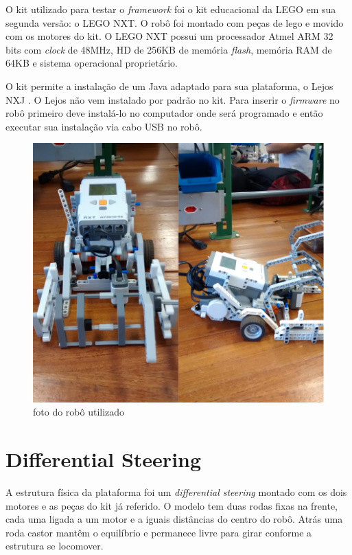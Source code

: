 O kit utilizado para testar o \textit{framework} foi o kit educacional da LEGO em sua segunda versão: o LEGO NXT. O robô foi montado com peças de lego e movido com os motores do kit. O LEGO NXT possui um processador Atmel ARM 32 bits com \textit{clock} de 48MHz, HD de 256KB de memória \textit{flash}, memória RAM de 64KB e sistema operacional proprietário.

O kit permite a instalação de um Java adaptado para sua plataforma, o Lejos NXJ \cite{LEJOS_SITE}. O Lejos não vem instalado por padrão no kit. Para inserir o \textit{firmware} no robô primeiro deve instalá-lo no computador onde será programado e então executar sua instalação via cabo USB no robô.

\begin{figure}[h]
	\centering
	\label{fig17}
		\includegraphics[keepaspectratio=true,scale=0.2]{figuras/5nxtBrick.png}
	\caption{foto do robô utilizado}
\end{figure}

\section{Differential Steering}

A estrutura física da plataforma foi um \textit{differential steering} montado com os dois motores e as peças do kit já referido. O modelo tem duas rodas fixas na frente, cada uma ligada a um motor e a iguais distâncias do centro do robô. Atrás uma roda castor mantêm o equilíbrio e permanece livre para girar conforme a estrutura se locomover.

